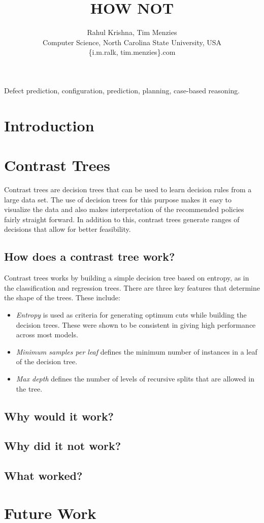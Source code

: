 \documentclass[conference]{IEEEtran}
\title{HOW NOT}
\author{Rahul Krishna, Tim Menzies\\
        Computer Science, North Carolina State University, USA\\
       \{i.m.ralk, tim.menzies\}\@gmail.com
       
}
\begin{document}
  \maketitle
    \begin{abstract}
 
  \end{abstract}
  \begin{IEEEkeywords}
Defect prediction, configuration, prediction, planning, case-based reasoning.
  \end{IEEEkeywords}

\section{Introduction} 
\section{Contrast Trees}
Contrast trees are decision trees that can be used to learn decision rules from a large data set. The use of decision trees for this purpose makes it easy to visualize the data and also makes interpretation of the recommended policies fairly straight forward. In addition to this, contrast trees generate ranges of decisions that allow for better feasibility.
\subsection{How does a contrast tree work?}
Contrast trees works by building a simple decision tree based on entropy, as in the classification and regression trees. There are three key features that determine the shape of the trees. These include:
\begin{itemize}
\item \textit{Entropy} is used as criteria for generating optimum cuts while building the decision trees. These were shown to be consistent in giving high performance across most models.
\item \textit{Minimum samples per leaf} defines the minimum number of instances in a leaf of the decision tree.
\item \textit{Max depth} defines the number of levels of recursive splits that are allowed in the tree.
\end{itemize}
\subsection{Why would it work?}
\subsection{Why did it not work?}
\subsection{What worked?}
\section{Future Work}
\end{document}
